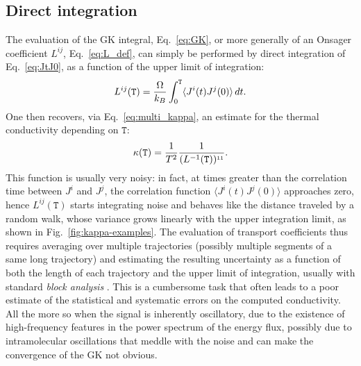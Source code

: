 \begin{LEtext}
\subsection{Direct integration}  \label{sec:direct-integration}
The evaluation of the GK integral, Eq.~\eqref{eq:GK}, or more generally of an Onsager coefficient $L^{ij}$, Eq.~\eqref{eq:L_def}, can simply be performed by direct integration of Eq.~\eqref{eq:JtJ0}, as a function of the upper limit of integration: 
\begin{equation}
    L^{ij}(\mathtt{T}) = \frac{\rOmega}{k_B} \int_0^{\mathtt{T}} \langle J^i(t)J^j(0)\rangle \,dt .  \label{eq:Lij-integralT}
\end{equation}
One then recovers, via Eq.~\eqref{eq:multi_kappa}, an estimate for the thermal conductivity depending on $\mathtt{T}$:
\begin{equation}
    \kappa(\mathtt{T}) = \frac{1}{T^2} \frac{1}{(L^{-1}(\mathtt{T}))^{\smallone\smallone}}.  \label{eq:kappa-integralT}
\end{equation}
This function is usually very noisy: in fact, at times greater than the correlation time between $J^i$ and $J^j$, the correlation function $\langle J^i(t)J^j(0)\rangle$ approaches zero, hence $L^{ij}(\mathtt{T})$ starts integrating noise and behaves like the distance traveled by a random walk, whose variance grows linearly with the upper integration limit, as shown in Fig.~\ref{fig:kappa-examples}.
The evaluation of transport coefficients thus requires averaging over multiple trajectories (possibly multiple segments of a same long trajectory) and estimating the resulting uncertainty as a function of both the length of each trajectory and the upper limit of integration, usually with standard \emph{block analysis} \cite{Frenkel2001}. This is a cumbersome task that often leads to a poor estimate of the statistical and systematic errors on the computed conductivity. All the more so when the signal is inherently oscillatory, due to the existence of high-frequency features in the power spectrum of the energy flux, possibly due to intramolecular oscillations that meddle with the noise and can make the convergence of the GK not obvious.


\end{LEtext}

